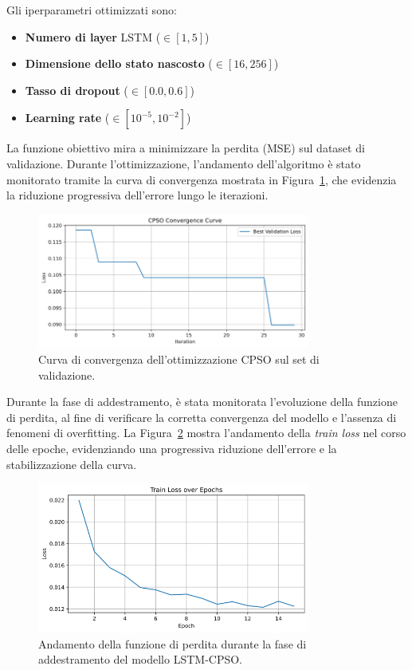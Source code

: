 \documentclass{article}
\begin{document}
Gli iperparametri ottimizzati sono:
\begin{itemize}
\item \textbf{Numero di layer} LSTM ($\in [1, 5]$)
\item \textbf{Dimensione dello stato nascosto} ($\in [16, 256]$)
\item \textbf{Tasso di dropout} ($\in [0.0, 0.6]$)
\item \textbf{Learning rate} ($\in [10^{-5}, 10^{-2}]$)
\end{itemize}

La funzione obiettivo mira a minimizzare la perdita (MSE) sul dataset di validazione. Durante 
l’ottimizzazione, l’andamento dell’algoritmo è stato monitorato tramite la curva di convergenza 
mostrata in Figura~\ref{fig:cpso}, che evidenzia la riduzione progressiva dell’errore lungo le 
iterazioni.

\begin{figure}[H]
\centering
\includegraphics[width=0.8\textwidth]{img/CPSO Convergence Curve.png}
\caption{Curva di convergenza dell’ottimizzazione CPSO sul set di validazione.}
\label{fig:cpso}
\end{figure}

Durante la fase di addestramento, è stata monitorata l’evoluzione della funzione di perdita, al fine di 
verificare la corretta convergenza del modello e l’assenza di fenomeni di overfitting. 
La Figura~\ref{fig:train_loss} mostra l’andamento della \textit{train loss} nel corso delle epoche, 
evidenziando una progressiva riduzione dell’errore e la stabilizzazione della curva.

\begin{figure}[H]
    \centering
    \includegraphics[width=0.8\textwidth]{img/Train Loss.png}
    \caption{Andamento della funzione di perdita durante la fase di addestramento del modello LSTM-CPSO.}
    \label{fig:train_loss}
\end{figure}
\end{document}
